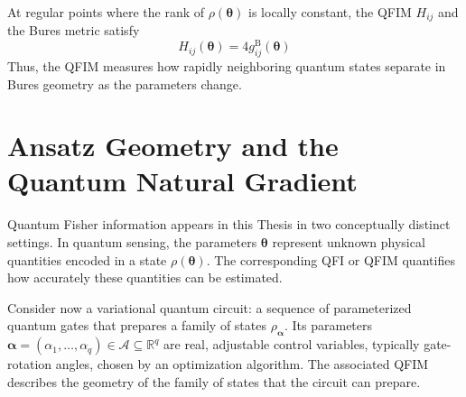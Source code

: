 \begin{proposition}
    At regular points where the rank of $\rho(\boldsymbol{\theta})$ is locally constant, the QFIM $H_{ij}$ and the Bures metric satisfy
    \begin{equation}
        H_{ij}(\boldsymbol{\theta})
        =4g_{ij}^{\mathrm B}(\boldsymbol{\theta})
        \label{def:qfim_bures_relation}
    \end{equation}
    Thus, the QFIM measures how rapidly neighboring quantum states separate in Bures geometry as the parameters change.
\end{proposition}


\section{Ansatz Geometry and the Quantum Natural Gradient}

Quantum Fisher information appears in this Thesis in two conceptually
distinct settings. In quantum sensing, the parameters
$\boldsymbol{\theta}$ represent unknown physical quantities encoded in a
state $\rho(\boldsymbol{\theta})$. The corresponding QFI or QFIM
quantifies how accurately these quantities can be estimated.

Consider now a variational quantum circuit: a sequence of parameterized
quantum gates that prepares a family of states
$\rho_{\boldsymbol{\alpha}}$. Its parameters
$\boldsymbol{\alpha}=(\alpha_1,\ldots,\alpha_q)
    \in\mathcal{A}\subseteq\mathbb{R}^q$ are real, adjustable control
variables, typically gate-rotation angles, chosen by an optimization
algorithm. The associated QFIM describes the geometry of the family of
states that the circuit can prepare.

